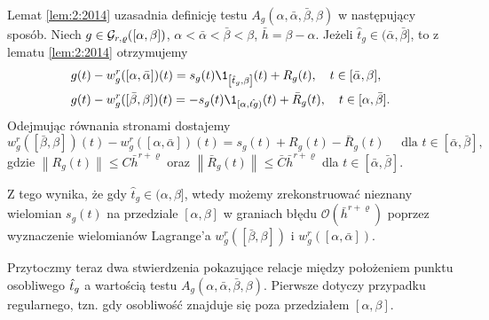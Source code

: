 \documentclass[oik, pdftex, man]{mgrwms}
\begin{document}
    Lemat \ref{lem:2:2014} uzasadnia definicję testu $A_{g}(\alpha, \bar{\alpha}, \bar{\beta}, \beta)$ w następujący sposób.
    \noindent
    Niech $g \in \mathcal{G}_{r,\varrho}([\alpha,\beta])$, $\alpha<\bar{\alpha}<\bar{\beta}<\beta$, $\bar{h}=\beta-\alpha$. Jeżeli $\hat{t}_{g} \in(\bar{\alpha}, \bar{\beta}]$, to z lematu \ref{lem:2:2014} otrzymujemy
    \begin{equation*}
        \begin{aligned}
            &g(t)-w_{g}^{r}([\alpha, \bar{\alpha}])(t)=s_{g}(t) \1_{\left[\hat{t}_{g}, \beta\right]}(t)+R_{g}(t), \quad t \in[\bar{\alpha}, \beta], \\
            &g(t)-w_{g}^{r}([\bar{\beta}, \beta])(t)=-s_{g}(t) \1_{[\alpha, \hat{t g})}(t)+\bar{R}_{g}(t), \quad t \in[\alpha, \bar{\beta}].
        \end{aligned}
    \end{equation*}
    Odejmując równania stronami dostajemy
    \begin{equation} \label{eq:16}
        w_{g}^{r}([\bar{\beta}, \beta])(t)-w_{g}^{r}([\alpha, \bar{\alpha}])(t)=s_{g}(t)+R_{g}(t)-\bar{R}_{g}(t) \quad \text{ dla }t \in[\bar{\alpha}, \bar{\beta}],
    \end{equation}
    gdzie $\left\|R_{g}(t)\right\| \leq C\bar{h}^{r+\varrho}$ oraz $\left\|\bar{R}_{g}(t)\right\| \leq \bar{C} \bar{h}^{r+\varrho}$ dla $t \in[\bar{\alpha}, \bar{\beta}]$.

    Z tego wynika, że gdy $\hat{t}_{g} \in (\alpha, \beta]$, wtedy możemy zrekonstruować nieznany wielomian $s_{g}(t)$ na przedziale $[\alpha, \beta]$ w graniach błędu $\mathcal{O}(\bar{h}^{r+\varrho})$ poprzez wyznaczenie wielomianów Lagrange'a $w_{g}^{r}([\bar{\beta}, \beta])$ i $w_{g}^{r}([\alpha, \bar{\alpha}])$.

    Przytoczmy teraz dwa stwierdzenia pokazujące relacje między położeniem punktu osobliwego $\hat{t}_{g}$ a wartością testu $A_{g}(\alpha, \bar{\alpha}, \bar{\beta}, \beta)$. Pierwsze dotyczy przypadku regularnego, tzn. gdy osobliwość znajduje się poza przedziałem $[\alpha, \beta]$.
\end{document}
